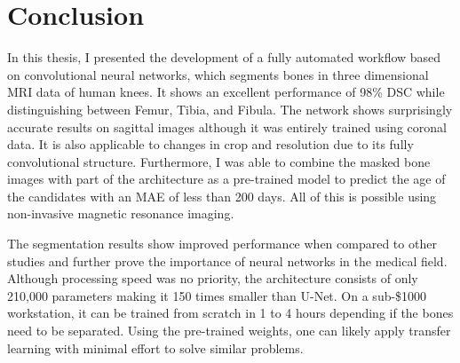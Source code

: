 \section{Conclusion}

In this thesis, I presented the development of a fully automated workflow based on convolutional neural networks, which segments bones in three dimensional MRI data of human knees. It shows an excellent performance of 98\% DSC while distinguishing between Femur, Tibia, and Fibula. The network shows surprisingly accurate results on sagittal images although it was entirely trained using coronal data. It is also applicable to changes in crop and resolution due to its fully convolutional structure. Furthermore, I was able to combine the masked bone images with part of the architecture as a pre-trained model to predict the age of the candidates with an MAE of less than 200 days. All of this is possible using non-invasive magnetic resonance imaging.

The segmentation results show improved performance when compared to other studies and further prove the importance of neural networks in the medical field. Although processing speed was no priority, the architecture consists of only 210,000 parameters making it 150 times smaller than U-Net. On a sub-\$1000 workstation, it can be trained from scratch in 1 to 4 hours depending if the bones need to be separated. Using the pre-trained weights, one can likely apply transfer learning with minimal effort to solve similar problems.

\newpage